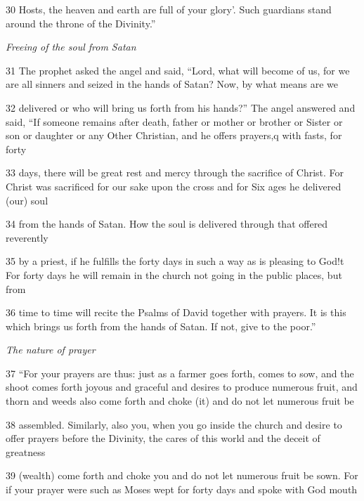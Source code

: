 \par 30 Hosts, the heaven and earth are full of your glory’. Such guardians stand around the throne of the Divinity.”

\par \textit{Freeing of the soul from Satan}

\par 31 The prophet asked the angel and said, “Lord, what will become of us, for we are all sinners and seized in the hands of Satan? Now, by what means are we

\par 32 delivered or who will bring us forth from his hands?” The angel answered and said, “If someone remains after death, father or mother or brother or Sister or son or daughter or any Other Christian, and he offers prayers,q with fasts, for forty

\par 33 days, there will be great rest and mercy through the sacrifice of Christ. For Christ was sacrificed for our sake upon the cross and for Six ages he delivered (our) soul

\par 34 from the hands of Satan. How the soul is delivered through that offered reverently

\par 35 by a priest, if he fulfills the forty days in such a way as is pleasing to God!t For forty days he will remain in the church not going in the public places, but from

\par 36 time to time will recite the Psalms of David together with prayers. It is this which brings us forth from the hands of Satan. If not, give to the poor.”

\par \textit{The nature of prayer}

\par 37 “For your prayers are thus: just as a farmer goes forth, comes to sow, and the shoot comes forth joyous and graceful and desires to produce numerous fruit, and thorn and weeds also come forth and choke (it) and do not let numerous fruit be

\par 38 assembled. Similarly, also you, when you go inside the church and desire to offer prayers before the Divinity, the cares of this world and the deceit of greatness

\par 39 (wealth) come forth and choke you and do not let numerous fruit be sown. For if your prayer were such as Moses wept for forty days and spoke with God mouth


